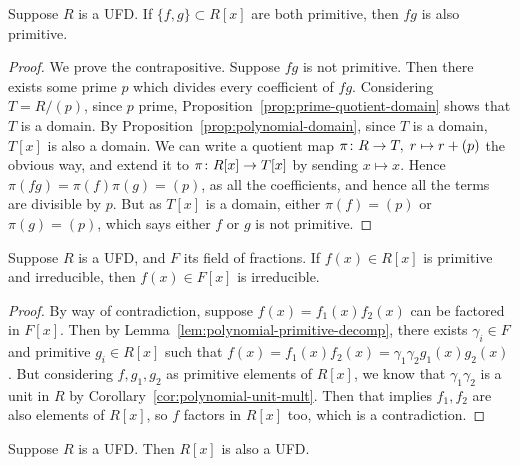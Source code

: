 \begin{lemma}\label{lem:gauss-primitive}
    Suppose \(R\) is a UFD.\@
    If \(\{f,g\} \subset R[x]\) are both primitive,
    then \(fg\) is also primitive.
\end{lemma}
\begin{proof}
    We prove the contrapositive.
    Suppose \(fg\) is not primitive.
    Then there exists some prime \(p\) which divides every coefficient of \(fg\).
    Considering \(T = R/(p)\), since \(p\) prime,
    Proposition~\ref{prop:prime-quotient-domain} shows that \(T\) is a domain.
    By Proposition~\ref{prop:polynomial-domain},
    since \(T\) is a domain, \(T[x]\) is also a domain.
    We can write a quotient map \(\pi\colon R\to T,\;r\mapsto r+(p)\) the obvious way,
    and extend it to \(\pi\colon R[x]\to T[x]\) by sending \(x \mapsto x\).
    Hence \(\pi(fg) = \pi(f)\pi(g) = (p)\),
    as all the coefficients, and hence all the terms are divisible by \(p\).
    But as \(T[x]\) is a domain, either \(\pi(f) = (p)\) or \(\pi(g) = (p)\),
    which says either \(f\) or \(g\) is not primitive.
\end{proof}
\begin{lemma}\label{lem:gauss-irreducible}
    Suppose \(R\) is a UFD, and \(F\) its field of fractions.
    If \(f(x) \in R[x]\) is primitive and irreducible,
    then \(f(x) \in F[x]\) is irreducible.
\end{lemma}
\begin{proof}
    By way of contradiction, suppose \(f(x) = f_1(x)f_2(x)\)
    can be factored in \(F[x]\).
    Then by Lemma~\ref{lem:polynomial-primitive-decomp},
    there exists \(\gamma_i \in F\) and primitive \(g_i \in R[x]\)
    such that \(f(x) = f_1(x)f_2(x) = \gamma_1\gamma_2 g_1(x)g_2(x)\).
    But considering \(f,g_1,g_2\) as primitive elements of \(R[x]\),
    we know that \(\gamma_1\gamma_2\) is a unit in \(R\)
    by Corollary~\ref{cor:polynomial-unit-mult}.
    Then that implies \(f_1,f_2\) are also elements of \(R[x]\),
    so \(f\) factors in \(R[x]\) too,
    which is a contradiction.
\end{proof}
\begin{theorem}
    Suppose \(R\) is a UFD.\@
    Then \(R[x]\) is also a UFD.\@
\end{theorem}
